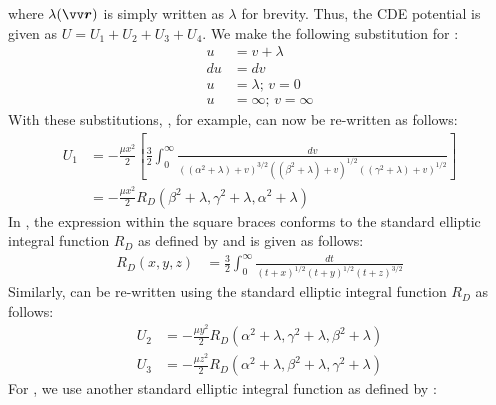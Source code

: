 where $\lambda{(\bvector{r})}$ is simply written as $\lambda$ for brevity. Thus, the \gls{CDE} potential is given as $U = U_1 + U_2 + U_3 + U_4$. We make the following substitution for :
\begin{align}
    u &= v + \lambda
    \label{eqn:ellipsoidal_potential_substitution_1} \\
    du &= dv
    \label{eqn:ellipsoidal_potential_substitution_2} \\
    u &= \lambda \text{; } v = 0
    \label{eqn:ellipsoidal_potential_substitution_3} \\
    u &= \infty \text{; } v = \infty
    \label{eqn:ellipsoidal_potential_substitution_4}
\end{align}
With these substitutions, , for example, can now be re-written as follows:
\begin{align}
    U_1 &= -\frac{\mu x^2}{2} \left[\frac{3}{2} \int_{0}^{\infty} \frac{dv}{((\alpha^2 + \lambda) + v)^{3/2}((\beta^2 + \lambda) + v)^{1/2}((\gamma^2 + \lambda) + v)^{1/2}}\right]
    \label{eqn:ellipsoid_potential_split_1_mod} \\
    &= -\frac{\mu x^2}{2} R_D(\beta^2 + \lambda, \gamma^2 + \lambda, \alpha^2 + \lambda)
    \label{eqn:ellipsoid_potential_split_1_carlson}
\end{align}
In , the expression within the square braces conforms to the standard elliptic integral function $R_D$ as defined by \cite{carlsonEllipticIntegral} and is given as follows:
\begin{align}
    R_D(x, y, z) &= \frac{3}{2} \int_0^{\infty} \frac{dt}{(t+x)^{1/2}(t+y)^{1/2}(t+z)^{3/2}}
    \label{eqn:carlson_RD}
\end{align}
Similarly,  can be re-written using the standard elliptic integral function $R_D$ as follows:
\begin{align}
    U_2 &= -\frac{\mu y^2}{2} R_D(\alpha^2 + \lambda, \gamma^2 + \lambda, \beta^2 + \lambda)
    \label{eqn:ellipsoid_potential_split_2_carlson} \\
    U_3 &= -\frac{\mu z^2}{2} R_D(\alpha^2 + \lambda, \beta^2 + \lambda, \gamma^2 + \lambda)
    \label{eqn:ellipsoid_potential_split_3_carlson}
\end{align}
For , we use another standard elliptic integral function as defined by \cite{carlsonEllipticIntegral}:
